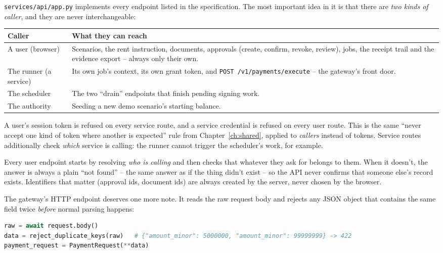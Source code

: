 \documentclass[11pt]{report}
\newcommand{\file}[1]{\texttt{#1}}
\newcommand{\code}[1]{\texttt{#1}}
\begin{document}
\file{services/api/app.py} implements every endpoint listed in the
specification. The most important idea in it is that there are \emph{two
kinds of caller}, and they are never interchangeable:

\begin{center}
\begin{tabular}{@{}p{3.3cm}p{10.2cm}@{}}
\toprule
\textbf{Caller} & \textbf{What they can reach} \\
\midrule
A user (browser) & Scenarios, the rent instruction, documents, approvals
  (create, confirm, revoke, review), jobs, the receipt trail and the
  evidence export -- always only their own. \\
The runner (a service) & Its own job's context, its own grant token, and
  \code{POST /v1/payments/execute} -- the gateway's front door. \\
The scheduler & The two ``drain'' endpoints that finish pending signing
  work. \\
The authority & Seeding a new demo scenario's starting balance. \\
\bottomrule
\end{tabular}
\end{center}

A user's session token is refused on every service route, and a service
credential is refused on every user route. This is the same ``never
accept one kind of token where another is expected'' rule from
Chapter~\ref{ch:shared}, applied to \emph{callers} instead of tokens.
Service routes additionally check \emph{which} service is calling: the
runner cannot trigger the scheduler's work, for example.

Every user endpoint starts by resolving \emph{who is calling} and then
checks that whatever they ask for belongs to them. When it doesn't, the
answer is always a plain ``not found'' -- the same answer as if the thing
didn't exist -- so the API never confirms that someone else's record
exists. Identifiers that matter (approval ids, document ids) are always
created by the server, never chosen by the browser.

The gateway's HTTP endpoint deserves one more note. It reads the raw
request body and rejects any JSON object that contains the same field
twice \emph{before} normal parsing happens:

\begin{lstlisting}[language=Python]
raw = await request.body()
data = reject_duplicate_keys(raw)   # {"amount_minor": 5000000, "amount_minor": 99999999} -> 422
payment_request = PaymentRequest(**data)
\end{lstlisting}
\end{document}
